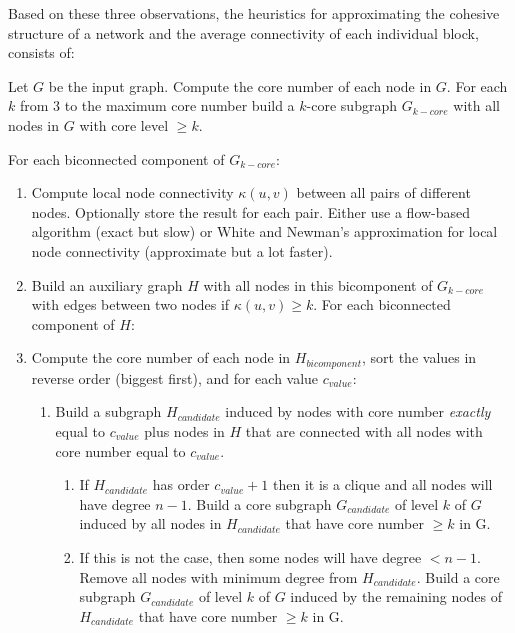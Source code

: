 Based on these three observations, the heuristics for approximating the cohesive structure of a network and the average connectivity of each individual block, consists of: 

Let $G$ be the input graph. Compute the core number of each node in $G$. For each $k$ from 3 to the maximum core number build a $k$-core subgraph $G_{k-core}$ with all nodes in $G$ with core level $\ge k$.

For each biconnected component of $G_{k-core}$:

\begin{enumerate}

\item Compute local node connectivity $\kappa(u,v)$ between all pairs of different nodes. Optionally store the result for each pair. Either use a flow-based algorithm (exact but slow) or White and Newman's approximation for local node connectivity (approximate but a lot faster).

\item Build an auxiliary graph $H$ with all nodes in this bicomponent of $G_{k-core}$ with edges between two nodes if $\kappa(u,v) \ge k$. For each biconnected component of $H$:

\item Compute the core number of each node in $H_{bicomponent}$, sort the values in reverse order (biggest first), and for each value $c_{value}$:

\begin{enumerate}

\item Build a subgraph $H_{candidate}$ induced by nodes with core number \emph{exactly} equal to $c_{value}$ plus nodes in $H$ that are connected with all nodes with core number equal to $c_{value}$.

\begin{enumerate}
\item If $H_{candidate}$ has order $c_{value} + 1$ then it is a clique and all nodes will have degree $n - 1$. Build a core subgraph $G_{candidate}$ of level $k$ of $G$ induced by all nodes in $H_{candidate}$ that have core number $\ge k$ in G.

\item If this is not the case, then some nodes will have degree $< n - 1$. Remove all nodes with minimum degree from $H_{candidate}$. Build a core subgraph $G_{candidate}$ of level $k$ of $G$ induced by the remaining nodes of $H_{candidate}$ that have core number $\ge k$ in G. 


\end{enumerate}
\end{enumerate}
\end{enumerate}
